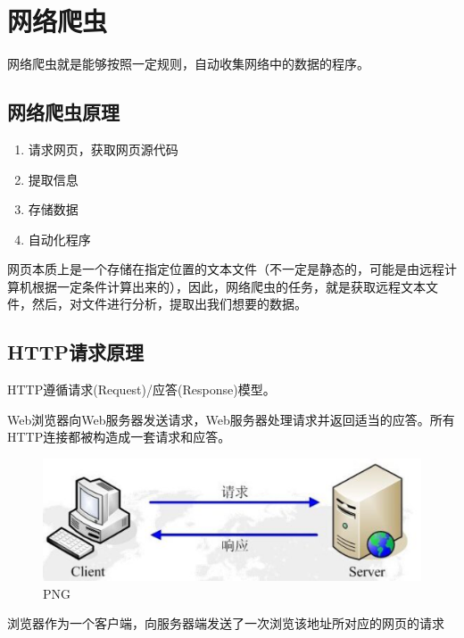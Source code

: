 \documentclass[]{ctexbook}
\providecommand{\tightlist}{%
  \setlength{\itemsep}{0pt}\setlength{\parskip}{0pt}}
\begin{document}
\hypertarget{spider}{%
\chapter{网络爬虫}\label{spider}}

网络爬虫就是能够按照一定规则，自动收集网络中的数据的程序。

\hypertarget{ux7f51ux7edcux722cux866bux539fux7406}{%
\section{网络爬虫原理}\label{ux7f51ux7edcux722cux866bux539fux7406}}

\begin{enumerate}
\def\labelenumi{\arabic{enumi}.}
\tightlist
\item
  请求网页，获取网页源代码
\item
  提取信息
\item
  存储数据
\item
  自动化程序
\end{enumerate}

网页本质上是一个存储在指定位置的文本文件（不一定是静态的，可能是由远程计算机根据一定条件计算出来的），因此，网络爬虫的任务，就是获取远程文本文件，然后，对文件进行分析，提取出我们想要的数据。

\hypertarget{httpux8bf7ux6c42ux539fux7406}{%
\section{HTTP请求原理}\label{httpux8bf7ux6c42ux539fux7406}}

HTTP遵循请求(Request)/应答(Response)模型。

Web浏览器向Web服务器发送请求，Web服务器处理请求并返回适当的应答。所有HTTP连接都被构造成一套请求和应答。

\begin{figure}
\centering
\includegraphics{images/http.png}
\caption{PNG}
\end{figure}

浏览器作为一个客户端，向服务器端发送了一次浏览该地址所对应的网页的请求
\end{document}
